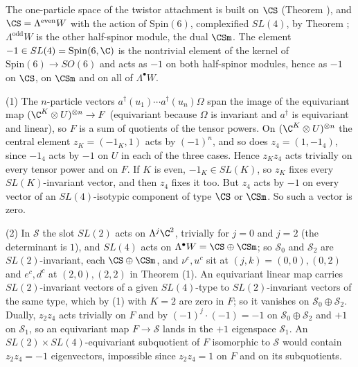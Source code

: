The one-particle space of the twistor attachment is built on $\CS$ (Theorem ), and $\CS = \Lambda^{\mathrm{even}}W$ with the action of $\mathrm{Spin}(6)$, complexified $SL(4)$, by Theorem ; $\Lambda^{\mathrm{odd}}W$ is the other half-spinor module, the dual $\CSm$. The element $-1 \in SL(4) = \mathrm{Spin}(6, \C)$ is the nontrivial element of the kernel of $\mathrm{Spin}(6) \to SO(6)$ and acts as $-1$ on both half-spinor modules, hence as $-1$ on $\CS$, on $\CSm$ and on all of $\Lambda^{\bullet}W$.

(1) The $n$-particle vectors $a^{\dagger}(u_{1})\cdots a^{\dagger}(u_{n})\Omega$ span the image of the equivariant map $(\C^{K}\otimes U)^{\otimes n} \to F$ (equivariant because $\Omega$ is invariant and $a^{\dagger}$ is equivariant and linear), so $F$ is a sum of quotients of the tensor powers. On $(\C^{K}\otimes U)^{\otimes n}$ the central element $z_{K} = (-1_{K}, 1)$ acts by $(-1)^{n}$, and so does $z_{4} = (1, -1_{4})$, since $-1_{4}$ acts by $-1$ on $U$ in each of the three cases. Hence $z_{K}z_{4}$ acts trivially on every tensor power and on $F$. If $K$ is even, $-1_{K} \in SL(K)$, so $z_{K}$ fixes every $SL(K)$-invariant vector, and then $z_{4}$ fixes it too. But $z_{4}$ acts by $-1$ on every vector of an $SL(4)$-isotypic component of type $\CS$ or $\CSm$. So such a vector is zero.

(2) In $\mathcal{S}$ the slot $SL(2)$ acts on $\Lambda^{j}\C^{2}$, trivially for $j = 0$ and $j = 2$ (the determinant is $1$), and $SL(4)$ acts on $\Lambda^{\bullet}W = \CS \oplus \CSm$; so $\mathcal{S}_{0}$ and $\mathcal{S}_{2}$ are $SL(2)$-invariant, each $\CS \oplus \CSm$, and $\nu^{c}, u^{c}$ sit at $(j, k) = (0, 0), (0, 2)$ and $e^{c}, d^{c}$ at $(2, 0), (2, 2)$ in Theorem (1). An equivariant linear map carries $SL(2)$-invariant vectors of a given $SL(4)$-type to $SL(2)$-invariant vectors of the same type, which by (1) with $K = 2$ are zero in $F$; so it vanishes on $\mathcal{S}_{0} \oplus \mathcal{S}_{2}$. Dually, $z_{2}z_{4}$ acts trivially on $F$ and by $(-1)^{j}\cdot(-1) = -1$ on $\mathcal{S}_{0}\oplus\mathcal{S}_{2}$ and $+1$ on $\mathcal{S}_{1}$, so an equivariant map $F \to \mathcal{S}$ lands in the $+1$ eigenspace $\mathcal{S}_{1}$. An $SL(2)\times SL(4)$-equivariant subquotient of $F$ isomorphic to $\mathcal{S}$ would contain $z_{2}z_{4} = -1$ eigenvectors, impossible since $z_{2}z_{4} = 1$ on $F$ and on its subquotients.

